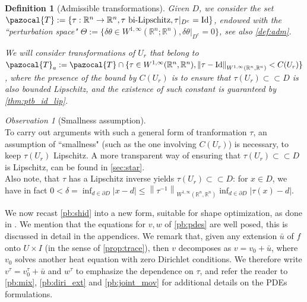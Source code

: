 \documentclass[english,a4paper,10pt,oneside]{scrbook}	%
\theoremstyle{break}
\newtheorem{defn}[equation]{Definition}
\theoremstyle{remark}
\newtheorem{obs}[equation]{Observation}
\newcommand{\mR}{\mathbb{R}}
\newcommand{\norm}[1]{\left\lVert#1\right\rVert}
\newcommand{\cc}{\subset\subset}
\newcommand{\cT}{\pazocal{T}}
\newcommand{\id}{\text{Id}}
\newcommand{\te}{\theta}
\newcommand{\Te}{\Theta}
\begin{document}
\begin{defn}[Admissible transformations]
\label{def:adm_transf}
Given $D$, we consider the set $\cT:=\{\tau:\mR^n\rightarrow\mR^n, \tau \text{ bi-Lipschitz}, \tau|_{D^c} = \id\}$, endowed with the ``perturbation space" $\Te:=\{ \delta \te \in W^{1,\infty}(\mR^n;\mR^n), \delta \te|_{D^c}=0\}$, see also \cref{def:adm}.

We will consider transformations of $U_r$ that belong to $\cT_a:=\cT \cap \{ \tau \in W^{1,\infty}(\mR^n, \mR^n), \norm{\tau - \id}_{W^{1,\infty}(\mR^n, \mR^n)}<C(U_r)\}$, where the presence of the bound by $C(U_r)$ is to ensure that $\tau(U_r)\cc D$ is also bounded Lipschitz, and the existence of such constant is guaranteed by \cref{thm:ptb_id_lip}.

\end{defn}

\begin{obs}[Smallness assumption]
\mbox{}\\
To carry out arguments with such a general form of tranformation $\tau$, an assumption of ``smallness" (such as the one involving $C(U_r)$) is necessary, to keep $\tau(U_r)$ Lipschitz. A more transparent way of ensuring that $\tau(U_r)\cc D$ is Lipschitz, can be found in \cref{sec:star}.
\mbox{}\\
Also note, that $\tau$ has a Lipschitz inverse yields $\tau(U_r)\cc D$: for $x \in D$, we have in fact $0<\delta = \inf_{d \in \partial D}|x-d|\leq \norm{\tau^{-1}}_{W^{1,\infty}(\mR^n,\mR^n)}\inf_{d \in \partial D}|\tau(x)-d|$.
\end{obs}


We now recast \cref{pb:shid} into a new form, suitable for shape optimization, as done in \cite{harbrecht}. We mention that the equations for $v,w$ of \cref{pb:pdes} are well posed, this is discussed in detail in the appendices. We remark that, given any extension $\bar{u}$ of $f$ onto $U\times I$ (in the sense of \cref{prop:trace}), then $v$ decomposes as $v = v_0+\bar{u}$, where $v_0$ solves another heat equation with zero Dirichlet conditions. We therefore write $v^\tau = v_0^\tau + \bar{u}$ and $w^\tau$ to emphasize the dependence on $\tau$, and refer the reader to \cref{pb:mix}, \cref{pb:diri_ext} and \cref{pb:joint_mov} for additional details on the PDEs formulations.
\end{document}
